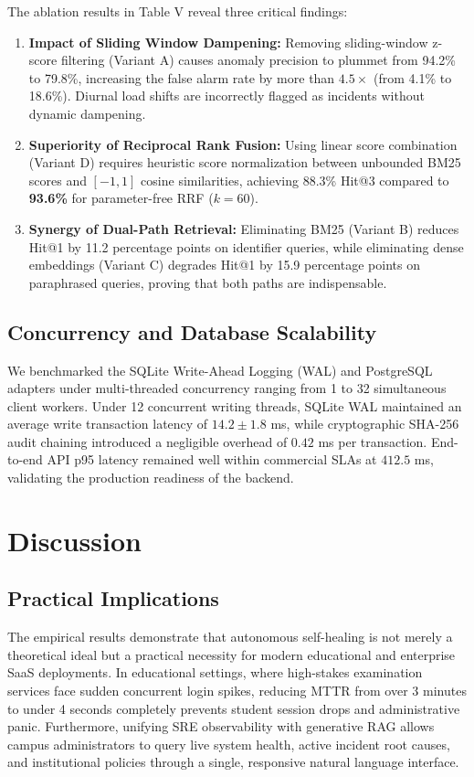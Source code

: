 \documentclass[12pt,onecolumn,draftclsnofoot]{IEEEtran}
\begin{document}
The ablation results in Table V reveal three critical findings:
\begin{enumerate}
    \item \textbf{Impact of Sliding Window Dampening:} Removing sliding-window z-score filtering (Variant A) causes anomaly precision to plummet from 94.2\% to 79.8\%, increasing the false alarm rate by more than $4.5\times$ (from 4.1\% to 18.6\%). Diurnal load shifts are incorrectly flagged as incidents without dynamic dampening.
    \item \textbf{Superiority of Reciprocal Rank Fusion:} Using linear score combination (Variant D) requires heuristic score normalization between unbounded BM25 scores and $[-1, 1]$ cosine similarities, achieving 88.3\% Hit@3 compared to \textbf{93.6\%} for parameter-free RRF ($k=60$).
    \item \textbf{Synergy of Dual-Path Retrieval:} Eliminating BM25 (Variant B) reduces Hit@1 by 11.2 percentage points on identifier queries, while eliminating dense embeddings (Variant C) degrades Hit@1 by 15.9 percentage points on paraphrased queries, proving that both paths are indispensable.
\end{enumerate}

\subsection{Concurrency and Database Scalability}
We benchmarked the SQLite Write-Ahead Logging (WAL) and PostgreSQL adapters under multi-threaded concurrency ranging from 1 to 32 simultaneous client workers. Under 12 concurrent writing threads, SQLite WAL maintained an average write transaction latency of $14.2 \pm 1.8$ ms, while cryptographic SHA-256 audit chaining introduced a negligible overhead of $0.42$ ms per transaction. End-to-end API p95 latency remained well within commercial SLAs at $412.5$ ms, validating the production readiness of the backend.

\section{Discussion}

\subsection{Practical Implications}
The empirical results demonstrate that autonomous self-healing is not merely a theoretical ideal but a practical necessity for modern educational and enterprise SaaS deployments. In educational settings, where high-stakes examination services face sudden concurrent login spikes, reducing MTTR from over 3 minutes to under 4 seconds completely prevents student session drops and administrative panic. Furthermore, unifying SRE observability with generative RAG allows campus administrators to query live system health, active incident root causes, and institutional policies through a single, responsive natural language interface.
\end{document}
